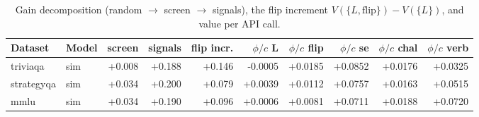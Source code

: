 \begin{table}[t]
\centering
\small
\begin{tabular}{llrrrrrrrr}
\toprule
Dataset & Model & screen & signals & flip incr. & $\phi/c$ L & $\phi/c$ flip & $\phi/c$ se & $\phi/c$ chal & $\phi/c$ verb \\
\midrule
triviaqa & sim & +0.008 & +0.188 & +0.146 & -0.0005 & +0.0185 & +0.0852 & +0.0176 & +0.0325 \\
strategyqa & sim & +0.034 & +0.200 & +0.079 & +0.0039 & +0.0112 & +0.0757 & +0.0163 & +0.0515 \\
mmlu & sim & +0.034 & +0.190 & +0.096 & +0.0006 & +0.0081 & +0.0711 & +0.0188 & +0.0720 \\
\bottomrule
\end{tabular}
\caption{Gain decomposition (random $\to$ screen $\to$ signals), the flip increment $V(\{L,\mathrm{flip}\})-V(\{L\})$, and value per API call.}
\label{tab:shapley_cost}
\end{table}
